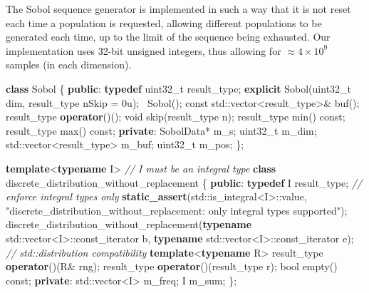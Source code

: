 \documentclass{JASSS}
\newenvironment{Shaded}{\begin{snugshade}}{\end{snugshade}}
\newcommand{\KeywordTok}[1]{\textcolor[rgb]{0.13,0.29,0.53}{\textbf{{#1}}}}
\newcommand{\DataTypeTok}[1]{\textcolor[rgb]{0.13,0.29,0.53}{{#1}}}
\newcommand{\DecValTok}[1]{\textcolor[rgb]{0.00,0.00,0.81}{{#1}}}
\newcommand{\StringTok}[1]{\textcolor[rgb]{0.31,0.60,0.02}{{#1}}}
\newcommand{\CommentTok}[1]{\textcolor[rgb]{0.56,0.35,0.01}{\textit{{#1}}}}
\newcommand{\NormalTok}[1]{{#1}}
\begin{document}
The Sobol sequence generator is implemented in such a way that it is not reset
each time a population is requested, allowing different populations to
be generated each time, up to the limit of the sequence being exhausted.
Our implementation uses 32-bit unsigned integers, thus allowing for
\(\approx4\times10^9\) samples (in each dimension).

\begin{Shaded}
\begin{Highlighting}[]
  \KeywordTok{class} \NormalTok{Sobol}
  \NormalTok{\{}
  \KeywordTok{public}\NormalTok{:}
    \KeywordTok{typedef} \DataTypeTok{uint32_t} \NormalTok{result_type;}
    \KeywordTok{explicit} \NormalTok{Sobol(}\DataTypeTok{uint32_t} \NormalTok{dim, result_type nSkip = }\DecValTok{0u}\NormalTok{);}
    \NormalTok{~Sobol();}
    \DataTypeTok{const} \NormalTok{std::vector<result_type>& buf();}
    \NormalTok{result_type }\KeywordTok{operator}\NormalTok{()();}
    \DataTypeTok{void} \NormalTok{skip(result_type n);}
    \NormalTok{result_type min() }\DataTypeTok{const}\NormalTok{;}
    \NormalTok{result_type max() }\DataTypeTok{const}\NormalTok{;}
  \KeywordTok{private}\NormalTok{:}
    \NormalTok{SobolData* m_s;}
    \DataTypeTok{uint32_t} \NormalTok{m_dim;}
    \NormalTok{std::vector<result_type> m_buf;}
    \DataTypeTok{uint32_t} \NormalTok{m_pos;}
  \NormalTok{\};}

  \KeywordTok{template}\NormalTok{<}\KeywordTok{typename} \NormalTok{I> }\CommentTok{// I must be an integral type}
  \KeywordTok{class} \NormalTok{discrete_distribution_without_replacement}
  \NormalTok{\{}
  \KeywordTok{public}\NormalTok{:}
    \KeywordTok{typedef} \NormalTok{I result_type;}
    \CommentTok{// enforce integral types only}
    \KeywordTok{static_assert}\NormalTok{(std::is_integral<I>::value, }
      \StringTok{"discrete_distribution_without_replacement: only integral types supported"}\NormalTok{);}
    \NormalTok{discrete_distribution_without_replacement(}\KeywordTok{typename} \NormalTok{std::vector<I>::const_iterator b, }
                                              \KeywordTok{typename} \NormalTok{std::vector<I>::const_iterator e);}
    \CommentTok{// std::distribution compatibility}
    \KeywordTok{template}\NormalTok{<}\KeywordTok{typename} \NormalTok{R>}
    \NormalTok{result_type }\KeywordTok{operator}\NormalTok{()(R& rng);}
    \NormalTok{result_type }\KeywordTok{operator}\NormalTok{()(result_type r);}
    \DataTypeTok{bool} \NormalTok{empty() }\DataTypeTok{const}\NormalTok{;}
  \KeywordTok{private}\NormalTok{:}
    \NormalTok{std::vector<I> m_freq;}
    \NormalTok{I m_sum;}
  \NormalTok{\};}
\end{Highlighting}
\end{Shaded}
\end{document}

